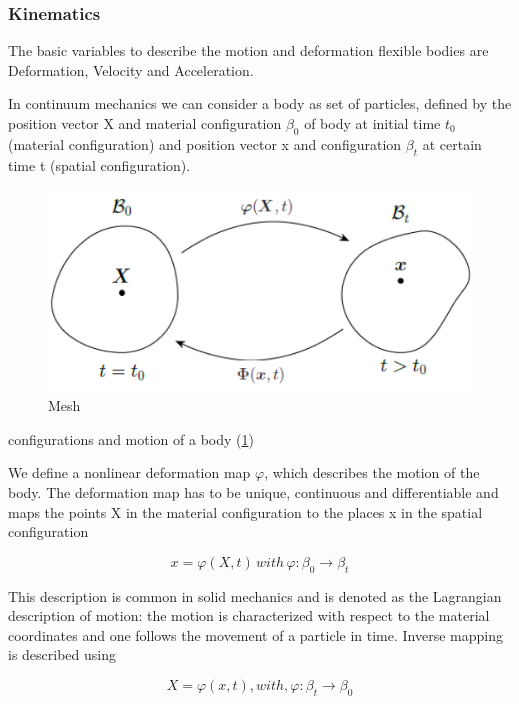 \subsubsection{Kinematics \citep{FEM}}

The basic variables to describe the motion and deformation flexible
bodies are Deformation, Velocity and Acceleration. 

In continuum mechanics we can consider a body as set of particles,
defined by the position vector X and material configuration $\beta_{0}$
of body at initial time $t_{0}$ (material configuration)
and position vector x and configuration $\beta_{t}$
at certain time t (spatial configuration).

\begin{figure}[H]
    \centering
	\includegraphics[scale=0.25]{../images/potato.png}
	\caption{Mesh}
	\label{fig:potato}
\end{figure}

configurations and motion of a body (\ref{fig:potato})

We define a nonlinear deformation map $\varphi$, which describes
the motion of the body. The deformation map has to be unique, continuous
and differentiable and maps the points X in the material configuration
to the places x in the spatial configuration 

\begin{equation}
x=\varphi(X,t)\,with\,\varphi\colon\beta_{0}\rightarrow\beta_{t}
\end{equation}


This description is common in solid mechanics and is denoted as the
Lagrangian description of motion: the motion is characterized with
respect to the material coordinates and one follows the movement of
a particle in time. Inverse mapping is described using 

\begin{equation}
X=\varphi(x,t) , with, \varphi: \beta_{t}\rightarrow\beta_{0}
\end{equation}



